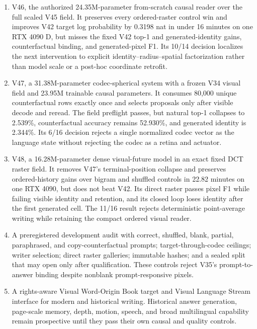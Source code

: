 \documentclass[11pt]{article}
\begin{document}
\begin{enumerate}[leftmargin=*]
  in V45 coordinates.
  \item V46, the authorized 24.35M-parameter from-scratch causal reader over the
  full scaled V45 field. It preserves every ordered-raster control win and
  improves V42 target log probability by 0.3198 nat in under 16 minutes on one
  RTX 4090 D, but misses the fixed V42 top-1 and generated-identity gains,
  counterfactual binding, and generated-pixel F1. Its 10/14 decision localizes
  the next intervention to explicit identity--radius--spatial factorization
  rather than model scale or a post-hoc coordinate retrofit.
  \item V47, a 31.38M-parameter codec-spherical system with a frozen V34 visual
  field and 23.95M trainable causal parameters. It consumes 80,000 unique
  counterfactual rows exactly once and selects proposals only after visible
  decode and reread. The field preflight passes, but natural top-1 collapses to
  2.539\%, counterfactual accuracy remains 52.930\%, and generated identity is
  2.344\%. Its 6/16 decision rejects a single normalized codec vector as the
  language state without rejecting the codec as a retina and actuator.
  \item V48, a 16.28M-parameter dense visual-future model in an exact fixed
  DCT raster field. It removes V47's terminal-position collapse and preserves
  ordered-history gains over bigram and shuffled controls in 22.82 minutes on
  one RTX 4090, but does not beat V42. Its direct raster passes pixel F1 while
  failing visible identity and retention, and its closed loop loses identity
  after the first generated cell. The 11/16 result rejects deterministic
  point-average writing while retaining the compact ordered visual reader.
  \item A preregistered development audit with correct, shuffled, blank,
  partial, paraphrased, and copy-counterfactual prompts; target-through-codec
  ceilings; writer selection; direct raster galleries; immutable hashes; and a
  sealed split that may open only after qualification. These controls reject
  V35's prompt-to-answer binding despite nonblank prompt-responsive pixels.
  \item A rights-aware Visual Word-Origin Book target and Visual Language Stream
  interface for modern and historical writing. Historical answer generation,
  page-scale memory, depth, motion, speech, and broad multilingual capability
  remain prospective until they pass their own causal and quality controls.
\end{enumerate}
\end{document}
